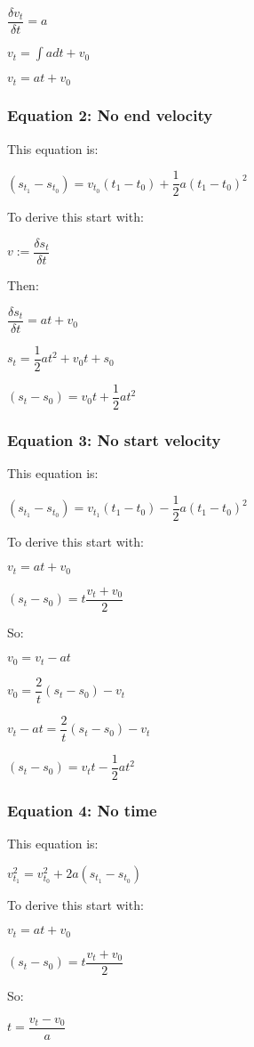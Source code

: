 \(\dfrac{\delta v_t}{\delta t}=a\)

\(v_t=\int a dt +v_0\)

\(v_t=at+v_0\)
\subsubsection{Equation 2: No end velocity}

This equation is:

\((s_{t_1}-s_{t_0})=v_{t_0}(t_1-t_0)+\dfrac{1}{2}a(t_1-t_0)^2\)

To derive this start with:

\(v:=\dfrac{\delta s_t}{\delta t}\)

Then:

\(\dfrac{\delta s_t}{\delta t}=at+v_0\)

\(s_t=\dfrac{1}{2}at^2+v_0t+s_0\)

\((s_t-s_0)=v_0t+\dfrac{1}{2}at^2 \)

\subsubsection{Equation 3: No start velocity}

This equation is:

\((s_{t_1}-s_{t_0})=v_{t_1}(t_1-t_0)-\dfrac{1}{2}a(t_1-t_0)^2\)

To derive this start with:

\(v_t=at+v_0\)

\((s_t-s_0)=t\dfrac{v_t+v_0}{2}\)

So:

\(v_0=v_t-at\)

\(v_0=\dfrac{2}{t}(s_t-s_0)- v_t\)

\(v_t-at=\dfrac{2}{t}(s_t-s_0)- v_t\)

\((s_t-s_0)=v_tt-\dfrac{1}{2}at^2\)

\subsubsection{Equation 4: No time}

This equation is:

\(v_{t_1}^2= v_{t_0}^2+2a(s_{t_1}-s_{t_0})\)

To derive this start with:

\(v_t=at+v_0\)

\((s_t-s_0)=t\dfrac{v_t+v_0}{2}\)

So:

\(t=\dfrac{v_t-v_0}{a}\)


